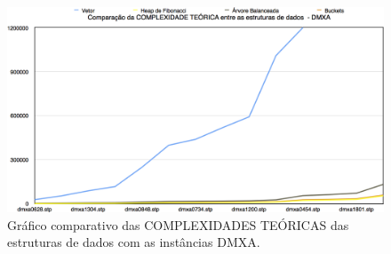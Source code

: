 \documentclass[
	12pt,				%
	oneside,			%
	a4paper,			%
	english,			%
	french,				%
	spanish,			%
	brazil,				%
	]{abntex2}
\begin{document}
\begin{figure}[H]
 \centering
 \includegraphics[width=6.4in]{charts/comp_teoria_dmxa.png}
 \caption{Gráfico comparativo das COMPLEXIDADES TEÓRICAS das estruturas de dados com as instâncias DMXA.}
 \label{fig:DmxaGraphComplex}
\end{figure}
\end{document}
